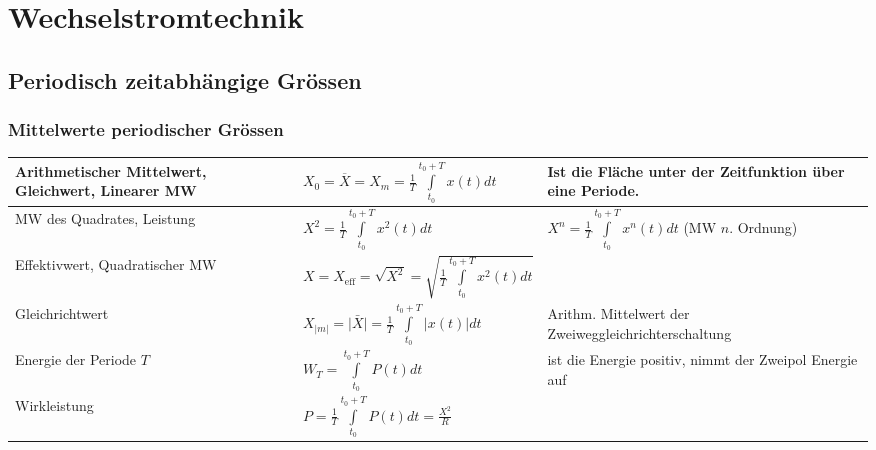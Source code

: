 \section{Wechselstromtechnik}
	\subsection{Periodisch zeitabh\"angige Gr\"ossen}
		

		\subsubsection{Mittelwerte periodischer Gr\"ossen}
			\begin{tabular}{|p{5.5cm}|p{6cm}|p{6.5cm}|}
			\hline
				Arithmetischer Mittelwert, Gleichwert, Linearer MW &
				$X_0 = \overline{X} = X_m = \frac {1} {T} \int\limits_{t_0}^{t_0+T} x(t)dt$ &
				Ist die Fl\"ache unter der Zeitfunktion \"uber eine Periode. \\
			\hline
				MW des Quadrates, Leistung &
				$X^2 = \frac {1} {T} \int\limits_{t_0}^{t_0+T} x^2(t)dt$ & 
				$X^n = \frac {1} {T} \int\limits_{t_0}^{t_0+T} x^n(t)dt$ (MW $n$. Ordnung) \\
			\hline
				Effektivwert, Quadratischer MW &
				$X = X_{\text{eff}}= \sqrt{X^2} = \sqrt{\frac{1}{T} \int\limits ^{t_0+T} _{t_0}{x^2(t)dt}}$
				& \\ 
			\hline
				Gleichrichtwert &
				$X_{|m|} = \bar{|X|} = \frac{1}{T} \int\limits_{t_0}^{t_0+T}{|x(t)| dt}$ &
				Arithm. Mittelwert der Zweiweggleichrichterschaltung \\
			\hline				    
				Energie der Periode $T$ &
				$W_T = \int\limits_{t_0}^{t_0+T}{P(t) dt}$ &
				ist die Energie positiv, nimmt der Zweipol Energie auf \\
			\hline                    
				Wirkleistung &
				$P = \frac{1}{T} \int\limits_{t_0}^{t_0+T}{P(t) dt}  = \frac{X^2}{R}$ & \\
			\hline
			\end{tabular}
			
